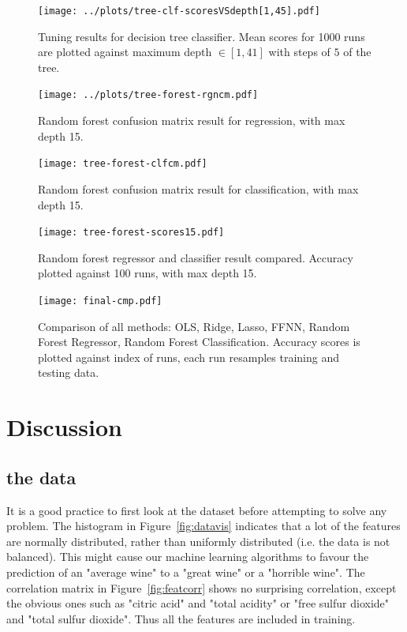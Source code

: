 \documentclass[english,notitlepage,reprint,nofootinbib]{revtex4-1}
\begin{document}
\begin{figure}[H]
	\centering
	\texttt{[image: ../plots/tree-clf-scoresVSdepth[1,45].pdf]}
	\caption{Tuning results for decision tree classifier. Mean scores for 1000 runs are plotted against maximum depth $ \in [1,41] $ with steps of $ 5 $  of the tree.}
	\label{fig:tree-clf-tune}
\end{figure}

\begin{figure}[H]
	\centering
	\texttt{[image: ../plots/tree-forest-rgncm.pdf]}
	\caption{Random forest confusion matrix result for regression, with max depth 15.}
	\label{fig:forest-rgncm}
\end{figure}

\begin{figure}[H]
	\centering
	\texttt{[image: tree-forest-clfcm.pdf]}
	\caption{Random forest confusion matrix result for classification, with max depth 15.}
	\label{fig:forest-clfcm}
\end{figure}

\begin{figure}[H]
	\centering
	\texttt{[image: tree-forest-scores15.pdf]}
	\caption{Random forest regressor and classifier result compared. Accuracy plotted against 100 runs, with max depth 15. }
	\label{fig:forest-compared}
\end{figure}

\begin{figure}[H]
	\centering
	\texttt{[image: final-cmp.pdf]}
	\caption{Comparison of all methods: OLS, Ridge, Lasso, FFNN, Random Forest Regressor, Random Forest Classification. Accuracy scores is plotted against index of runs, each run resamples training and testing data.}
	\label{fig:final-cmp}
\end{figure}


\section{Discussion}\label{sec:discussion}
%

\subsection{the data}
It is a good practice to first look at the dataset before attempting to solve any problem. The histogram in Figure~\ref{fig:datavis} indicates that a lot of the features are normally distributed, rather than uniformly distributed (i.e. the data is not balanced). This might cause our machine learning algorithms to favour the prediction of an "average wine" to a "great wine" or a "horrible wine". The correlation matrix in Figure~\ref{fig:featcorr} shows no surprising correlation, except the obvious ones such as "citric acid" and "total acidity" or "free sulfur dioxide" and "total sulfur dioxide". Thus all the features are included in training.
\end{document}
